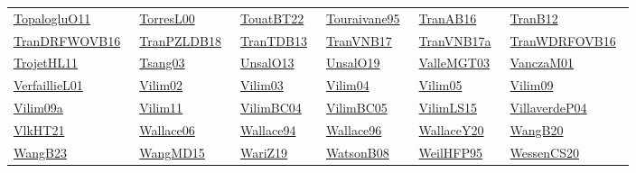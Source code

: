 \begin{longtable}{*{6}{l}}
\href{../works/TopalogluO11.pdf}{TopalogluO11}~\cite{TopalogluO11} & \href{../works/TorresL00.pdf}{TorresL00}~\cite{TorresL00} & \href{../works/TouatBT22.pdf}{TouatBT22}~\cite{TouatBT22} & \href{../works/Touraivane95.pdf}{Touraivane95}~\cite{Touraivane95} & \href{../works/TranAB16.pdf}{TranAB16}~\cite{TranAB16} & \href{../works/TranB12.pdf}{TranB12}~\cite{TranB12}\\ 
\href{../works/TranDRFWOVB16.pdf}{TranDRFWOVB16}~\cite{TranDRFWOVB16} & \href{../works/TranPZLDB18.pdf}{TranPZLDB18}~\cite{TranPZLDB18} & \href{../works/TranTDB13.pdf}{TranTDB13}~\cite{TranTDB13} & \href{../works/TranVNB17.pdf}{TranVNB17}~\cite{TranVNB17} & \href{../works/TranVNB17a.pdf}{TranVNB17a}~\cite{TranVNB17a} & \href{../works/TranWDRFOVB16.pdf}{TranWDRFOVB16}~\cite{TranWDRFOVB16}\\ 
\href{../works/TrojetHL11.pdf}{TrojetHL11}~\cite{TrojetHL11} & \href{../works/Tsang03.pdf}{Tsang03}~\cite{Tsang03} & \href{../}{UnsalO13}~\cite{UnsalO13} & \href{../}{UnsalO19}~\cite{UnsalO19} & \href{../works/ValleMGT03.pdf}{ValleMGT03}~\cite{ValleMGT03} & \href{../works/VanczaM01.pdf}{VanczaM01}~\cite{VanczaM01}\\ 
\href{../works/VerfaillieL01.pdf}{VerfaillieL01}~\cite{VerfaillieL01} & \href{../works/Vilim02.pdf}{Vilim02}~\cite{Vilim02} & \href{../works/Vilim03.pdf}{Vilim03}~\cite{Vilim03} & \href{../works/Vilim04.pdf}{Vilim04}~\cite{Vilim04} & \href{../works/Vilim05.pdf}{Vilim05}~\cite{Vilim05} & \href{../works/Vilim09.pdf}{Vilim09}~\cite{Vilim09}\\ 
\href{../works/Vilim09a.pdf}{Vilim09a}~\cite{Vilim09a} & \href{../works/Vilim11.pdf}{Vilim11}~\cite{Vilim11} & \href{../works/VilimBC04.pdf}{VilimBC04}~\cite{VilimBC04} & \href{../works/VilimBC05.pdf}{VilimBC05}~\cite{VilimBC05} & \href{../works/VilimLS15.pdf}{VilimLS15}~\cite{VilimLS15} & \href{../}{VillaverdeP04}~\cite{VillaverdeP04}\\ 
\href{../works/VlkHT21.pdf}{VlkHT21}~\cite{VlkHT21} & \href{../works/Wallace06.pdf}{Wallace06}~\cite{Wallace06} & \href{../}{Wallace94}~\cite{Wallace94} & \href{../works/Wallace96.pdf}{Wallace96}~\cite{Wallace96} & \href{../works/WallaceY20.pdf}{WallaceY20}~\cite{WallaceY20} & \href{../works/WangB20.pdf}{WangB20}~\cite{WangB20}\\ 
\href{../works/WangB23.pdf}{WangB23}~\cite{WangB23} & \href{../works/WangMD15.pdf}{WangMD15}~\cite{WangMD15} & \href{../}{WariZ19}~\cite{WariZ19} & \href{../works/WatsonB08.pdf}{WatsonB08}~\cite{WatsonB08} & \href{../}{WeilHFP95}~\cite{WeilHFP95} & \href{../works/WessenCS20.pdf}{WessenCS20}~\cite{WessenCS20}\\ 

\end{longtable}
